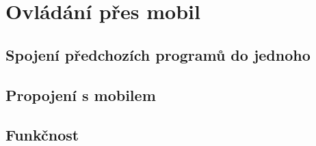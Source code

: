 \chapter{Ovládání přes mobil}

\section{Spojení předchozích programů do jednoho}

\section{Propojení s mobilem}

\section{Funkčnost}








\newpage